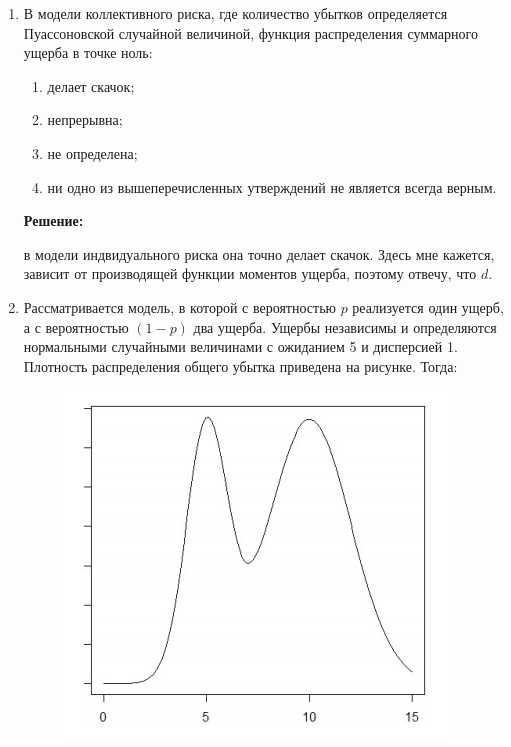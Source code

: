 \documentclass[%
12pt, %
final, %
oneside, %
onecolumn, %
centertags]{article} %
\theoremstyle{plain}
\theoremstyle{definition}
\theoremstyle{remark}
\begin{document}
\begin{enumerate}
\setlength\itemsep{-0.15em}

\item В модели коллективного риска, где количество убытков определяется Пуассоновской случайной величиной, функция распределения суммарного ущерба в точке ноль:
\begin{enumerate}
\setlength\itemsep{-0.15em}
    \item делает скачок;
    \item непрерывна;
    \item не определена;
    \item ни одно из вышеперечисленных утверждений не является всегда верным.
\end{enumerate}

\textbf{Решение:}

в модели индвидуального риска она точно делает скачок. Здесь мне кажется, зависит от производящей функции моментов ущерба, поэтому отвечу, что $d$.

\item Рассматривается модель, в которой с вероятностью $p$ реализуется один ущерб, а с вероятностью $(1-p)$ два ущерба. Ущербы независимы и определяются нормальными случайными величинами с ожиданием 5 и дисперсией 1. Плотность распределения общего убытка приведена на рисунке. Тогда:

\begin{figure}[!h]
    \begin{center}
    \includegraphics[scale=0.5]{image/1.png}
    \end{center}
\end{figure}



\end{enumerate}
\end{document}
